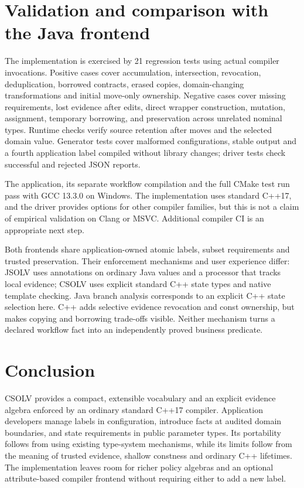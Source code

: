 \documentclass[11pt]{article}
\newcommand{\csolv}{\textsc{CSOLV}}
\newcommand{\jsolv}{\textsc{JSOLV}}
\begin{document}
\section{Validation and comparison with the Java frontend}
The implementation is exercised by 21 regression tests using actual compiler
invocations. Positive cases cover accumulation, intersection, revocation,
deduplication, borrowed contracts, erased copies, domain-changing
transformations and initial move-only ownership. Negative cases cover missing
requirements, lost evidence after edits, direct wrapper construction,
mutation, assignment, temporary borrowing, and preservation across unrelated
nominal types. Runtime checks verify source retention after moves and the
selected domain value. Generator tests cover malformed configurations,
stable output and a fourth application label compiled without library changes;
driver tests check successful and rejected JSON reports.

The application, its separate workflow compilation and the full CMake test
run pass with GCC 13.3.0 on Windows. The implementation uses standard C++17,
and the driver provides options for other compiler families, but this is not
a claim of empirical validation on Clang or MSVC. Additional compiler CI is
an appropriate next step.

Both frontends share application-owned atomic labels, subset requirements and
trusted preservation. Their enforcement mechanisms and user experience differ:
\jsolv{} uses annotations on ordinary Java values and a processor that tracks
local evidence; \csolv{} uses explicit standard C++ state types and native
template checking. Java branch analysis corresponds to an explicit C++ state
selection here. C++ adds selective evidence revocation and const ownership,
but makes copying and borrowing trade-offs visible. Neither mechanism turns a
declared workflow fact into an independently proved business predicate.

\section{Conclusion}
\csolv{} provides a compact, extensible vocabulary and an explicit evidence
algebra enforced by an ordinary standard C++17 compiler. Application developers
manage labels in configuration, introduce facts at audited domain boundaries,
and state requirements in public parameter types. Its portability follows
from using existing type-system mechanisms, while its limits follow from the
meaning of trusted evidence, shallow constness and ordinary C++ lifetimes.
The implementation leaves room for richer policy algebras and an optional
attribute-based compiler frontend without requiring either to add a new label.
\end{document}

